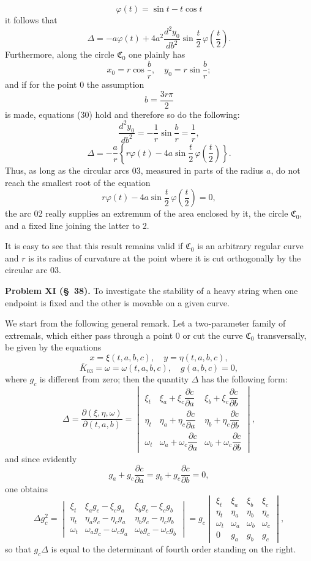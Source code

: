\documentclass[11pt,a4paper,leqno]{article}
\begin{document}
\[
\varphi(t)=\sin t-t\cos t
\]
it follows that
\[
\Delta=-a\varphi(t)+4a^2\frac{d^2y_0}{db^2}\sin\frac{t}{2}\,\varphi\left(\frac{t}{2}\right).
\]
Furthermore, along the circle $\mathfrak{C}_0$ one plainly has
\[
x_0=r\cos\frac{b}{r},\quad y_0=r\sin\frac{b}{r};
\]
and if for the point 0 the assumption
\[
b=\frac{3r\pi}{2}
\]
is made, equations (30) hold and therefore so do the following:
\[
\frac{d^2y_0}{db^2}=-\frac{1}{r}\sin\frac{b}{r}=\frac{1}{r},
\]
\[
\Delta=-\frac{a}{r}\left\{r\varphi(t)-4a\sin\frac{t}{2}\,\varphi\left(\frac{t}{2}\right)\right\}.
\]
Thus, as long as the circular arcs 03, measured in parts of the radius $a$, do not reach the smallest root of the equation
\[
r\varphi(t)-4a\sin\frac{t}{2}\,\varphi\left(\frac{t}{2}\right)=0,
\]
the arc 02 really supplies an extremum of the area enclosed by it, the circle $\mathfrak{C}_0$, and a fixed line joining the latter to 2.

It is easy to see that this result remains valid if $\mathfrak{C}_0$ is an arbitrary regular curve and $r$ is its radius of curvature at the point where it is cut orthogonally by the circular arc 03.

\noindent\textbf{Problem XI (\S~38).} To investigate the stability of a heavy string when one endpoint is fixed and the other is movable on a given curve.

We start from the following general remark. Let a two-parameter family of extremals, which either pass through a point 0 or cut the curve $\mathfrak{C}_0$ transversally, be given by the equations
\[
x=\xi(t,a,b,c),\quad y=\eta(t,a,b,c),
\]
\[
\overline{K}_{03}=\omega=\omega(t,a,b,c),\quad g(a,b,c)=0,
\]
where $g_c$ is different from zero; then the quantity $\Delta$ has the following form:
\begingroup
\setlength{\arraycolsep}{1pt}
\[
\Delta=\frac{\partial(\xi,\eta,\omega)}{\partial(t,a,b)}=
\begin{vmatrix}
\xi_t&\xi_a+\xi_c\dfrac{\partial c}{\partial a}&\xi_b+\xi_c\dfrac{\partial c}{\partial b}\\[1.0ex]
\eta_t&\eta_a+\eta_c\dfrac{\partial c}{\partial a}&\eta_b+\eta_c\dfrac{\partial c}{\partial b}\\[1.0ex]
\omega_t&\omega_a+\omega_c\dfrac{\partial c}{\partial a}&\omega_b+\omega_c\dfrac{\partial c}{\partial b}
\end{vmatrix},
\]
and since evidently
\[
g_a+g_c\frac{\partial c}{\partial a}=g_b+g_c\frac{\partial c}{\partial b}=0,
\]
one obtains
\[
\Delta g_c^2=\begin{vmatrix}
\xi_t&\xi_ag_c-\xi_cg_a&\xi_bg_c-\xi_cg_b\\
\eta_t&\eta_ag_c-\eta_cg_a&\eta_bg_c-\eta_cg_b\\
\omega_t&\omega_ag_c-\omega_cg_a&\omega_bg_c-\omega_cg_b
\end{vmatrix}
=g_c\begin{vmatrix}
\xi_t&\xi_a&\xi_b&\xi_c\\
\eta_t&\eta_a&\eta_b&\eta_c\\
\omega_t&\omega_a&\omega_b&\omega_c\\
0&g_a&g_b&g_c
\end{vmatrix},
\]
\endgroup
so that $g_c\Delta$ is equal to the determinant of fourth order standing on the right.
\end{document}
